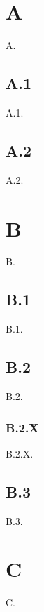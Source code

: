 \documentclass[11pt]{article}
\begin{document}
    \section{A}
    A.

    \subsection{A.1}
    A.1.

    \subsection{A.2}
    A.2.

    \section{B}
    B.

    \subsection{B.1}
    B.1.

    \subsection{B.2}
    B.2.

    \subsubsection{B.2.X}
    B.2.X.

    \subsection{B.3}
    B.3.

    \section{C}
    C.
\end{document}
